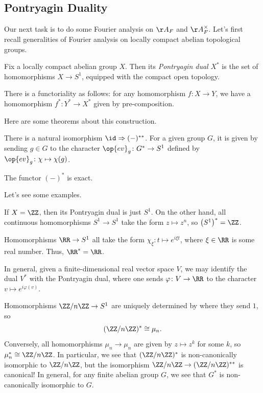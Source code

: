 \documentclass[../notes.tex]{subfiles}
\begin{document}
\subsection{Pontryagin Duality}
Our next task is to do some Fourier analysis on $\AA_F$ and $\AA_F^\times$. Let's first recall generalities of Fourier analysis on locally compact abelian topological groups.
\begin{definition}
	Fix a locally compact abelian group $X$. Then its \textit{Pontryagin dual} $X^*$ is the set of homomorphisms $X\to S^1$, equipped with the compact open topology.
\end{definition}
\begin{remark}
	There is a functoriality as follows: for any homomorphism $f\colon X\to Y$, we have a homomorphism $f^*\colon Y^*\to X^*$ given by pre-composition.
\end{remark}
Here are some theorems about this construction.
\begin{theorem}[Duality]
	There is a natural isomorphism ${\id}\Rightarrow(-)^{**}$. For a given group $G$, it is given by sending $g\in G$ to the character $\op{ev}_g\colon G^*\to S^1$ defined by $\op{ev}_g\colon\chi\mapsto\chi(g)$.
\end{theorem}
\begin{theorem}[Exact]
	The functor $(-)^*$ is exact.
\end{theorem}
Let's see some examples.
\begin{example}
	If $X=\ZZ$, then its Pontryagin dual is just $S^1$. On the other hand, all continuous homomorphisms $S^1\to S^1$ take the form $z\mapsto z^n$, so $\left(S^1\right)^*=\ZZ$.
\end{example}
\begin{example}
	Homomorphisms $\RR\to S^1$ all take the form $\chi_\xi\colon t\mapsto e^{i\xi t}$, where $\xi\in\RR$ is some real number. Thus, $\RR^*=\RR$.
\end{example}
\begin{example}
	In general, given a finite-dimensional real vector space $V$, we may identify the dual $V^*$ with the Pontryagin dual, where one sends $\varphi\colon V\to\RR$ to the character $v\mapsto e^{i\varphi(v)}$.
\end{example}
\begin{example}
	Homomorphisms $\ZZ/n\ZZ\to S^1$ are uniquely determined by where they send $1$, so
	\[(\ZZ/n\ZZ)^*\cong\mu_n.\]
	Conversely, all homomorphisms $\mu_n\to\mu_n$ are given by $z\mapsto z^k$ for some $k$, so $\mu_n^*\cong\ZZ/n\ZZ$. In particular, we see that $(\ZZ/n\ZZ)^*$ is non-canonically isomorphic to $\ZZ/n\ZZ$, but the isomorphism $\ZZ/n\ZZ\to(\ZZ/n\ZZ)^{**}$ is canonical! In general, for any finite abelian group $G$, we see that $G^*$ is non-canonically isomorphic to $G$.
\end{example}
\end{document}
